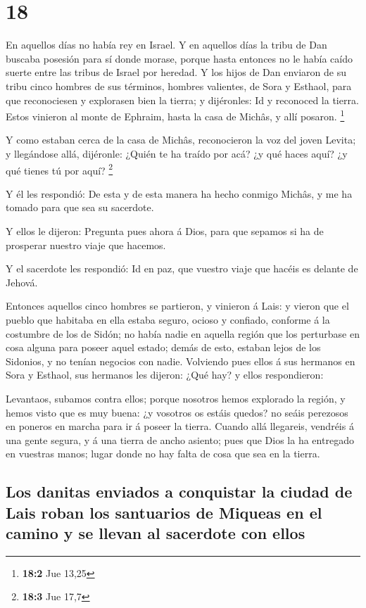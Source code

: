 \hypertarget{section-17}{%
\section{18}\label{section-17}}

 En aquellos días no había rey en Israel. Y en aquellos días
la tribu de Dan buscaba posesión para sí donde morase, porque hasta
entonces no le había caído suerte entre las tribus de Israel por
heredad.  Y los hijos de Dan enviaron de su tribu cinco
hombres de sus términos, hombres valientes, de Sora y Esthaol, para que
reconociesen y explorasen bien la tierra; y dijéronles: Id y reconoced
la tierra. Estos vinieron al monte de Ephraim, hasta la casa de Michâs,
y allí posaron. \footnote{\textbf{18:2} Jue 13,25}

 Y como estaban cerca de la casa de Michâs, reconocieron la
voz del joven Levita; y llegándose allá, dijéronle: ¿Quién te ha traído
por acá? ¿y qué haces aquí? ¿y qué tienes tú por aquí? \footnote{\textbf{18:3}
  Jue 17,7}

 Y él les respondió: De esta y de esta manera ha hecho
conmigo Michâs, y me ha tomado para que sea su sacerdote.

 Y ellos le dijeron: Pregunta pues ahora á Dios, para que
sepamos si ha de prosperar nuestro viaje que hacemos.

 Y el sacerdote les respondió: Id en paz, que vuestro viaje
que hacéis es delante de Jehová.

 Entonces aquellos cinco hombres se partieron, y vinieron á
Lais: y vieron que el pueblo que habitaba en ella estaba seguro, ocioso
y confiado, conforme á la costumbre de los de Sidón; no había nadie en
aquella región que los perturbase en cosa alguna para poseer aquel
estado; demás de esto, estaban lejos de los Sidonios, y no tenían
negocios con nadie.  Volviendo pues ellos á sus hermanos en
Sora y Esthaol, sus hermanos les dijeron: ¿Qué hay? y ellos
respondieron:

 Levantaos, subamos contra ellos; porque nosotros hemos
explorado la región, y hemos visto que es muy buena: ¿y vosotros os
estáis quedos? no seáis perezosos en poneros en marcha para ir á poseer
la tierra.  Cuando allá llegareis, vendréis á una gente
segura, y á una tierra de ancho asiento; pues que Dios la ha entregado
en vuestras manos; lugar donde no hay falta de cosa que sea en la
tierra.

\hypertarget{los-danitas-enviados-a-conquistar-la-ciudad-de-lais-roban-los-santuarios-de-miqueas-en-el-camino-y-se-llevan-al-sacerdote-con-ellos}{%
\subsection{Los danitas enviados a conquistar la ciudad de Lais roban
los santuarios de Miqueas en el camino y se llevan al sacerdote con
ellos}\label{los-danitas-enviados-a-conquistar-la-ciudad-de-lais-roban-los-santuarios-de-miqueas-en-el-camino-y-se-llevan-al-sacerdote-con-ellos}}

